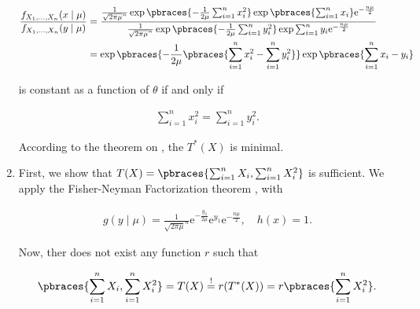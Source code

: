 \begin{solution}
\begin{enumerate}[label = (\alph*)]
    \begin{align*}
        \frac
        {
            f_{X_1, \dots, X_n}(x \mid \mu)
        }{
            f_{X_1, \dots, X_n}(y \mid \mu)
        }
        & =
        \frac
        {
            \frac{1}{\sqrt{2 \pi \mu}^n}
            \exp
            \pbraces
            {
                -\frac{1}{2 \mu}
                \sum_{i=1}^n
                    x_i^2
            }
            \exp \pbraces{\sum_{i=1}^n x_i}
            \mathrm e^{-\frac{n \mu}{2}}
        }{
            \frac{1}{\sqrt{2 \pi \mu}^n}
            \exp
            \pbraces
            {
                -\frac{1}{2 \mu}
                \sum_{i=1}^n
                    y_i^2
            }
            \exp \sum_{i=1}^n y_i
            \mathrm e^{-\frac{n \mu}{2}}
        } \\
        & =
        \exp
        \pbraces
        {
            -\frac{1}{2 \mu}
            \pbraces
            {
                \sum_{i=1}^n
                    x_i^2
                -
                \sum_{i=1}^n
                    y_i^2
            }
        }
        \exp \pbraces{\sum_{i=1}^n x_i - y_i}
    \end{align*}

    is constant as a function of $\theta$ if and only if

    \begin{align*}
        \sum_{i=1}^n
            x_i^2
        =
        \sum_{i=1}^n
            y_i^2.
    \end{align*}

    According to the theorem on \cite[lecture 8, slide 29]{EStat}, the $T^\ast(X)$ is minimal.

    \item First, we show that $T(X) = \pbraces{\sum_{i=1}^n X_i, \sum_{i=1}^n X_i^2}$ is sufficient.
    We apply the Fisher-Neyman Factorization theorem \cite[lecture 8, slide 13]{EStat}, with

    \begin{align*}
        g(y \mid \mu) = \frac{1}{\sqrt{2 \pi \mu}^n} \mathrm e^{-\frac{y_2}{2 \mu}} \mathrm e^{y_1} \mathrm e^{-\frac{n \mu}{2}},
        \quad
        h(x) = 1.
    \end{align*}

    Now, ther does not exist any function $r$ such that

    \begin{align*}
        \pbraces{\sum_{i=1}^n X_i, \sum_{i=1}^n X_i^2}
        =
        T(X)
        \stackrel{!}{=}
        r(T^\ast(X))
        =
        r \pbraces{\sum_{i=1}^n X_i^2}.
    \end{align*}
    

\end{enumerate}
\end{solution}
